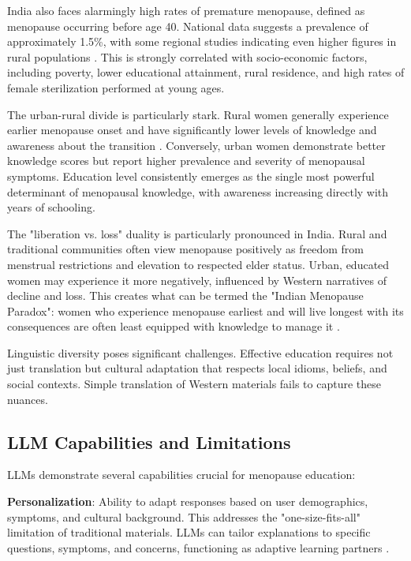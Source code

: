 \documentclass[letterpaper]{article} %
\begin{document}
India also faces alarmingly high rates of premature menopause, defined as menopause occurring before age 40. National data suggests a prevalence of approximately 1.5\%, with some regional studies indicating even higher figures in rural populations \cite{pmc2023naturalmenopause}. This is strongly correlated with socio-economic factors, including poverty, lower educational attainment, rural residence, and high rates of female sterilization performed at young ages.

The urban-rural divide is particularly stark. Rural women generally experience earlier menopause onset and have significantly lower levels of knowledge and awareness about the transition \cite{pmc2023ruralwomen}. Conversely, urban women demonstrate better knowledge scores but report higher prevalence and severity of menopausal symptoms. Education level consistently emerges as the single most powerful determinant of menopausal knowledge, with awareness increasing directly with years of schooling.

The "liberation vs. loss" duality is particularly pronounced in India. Rural and traditional communities often view menopause positively as freedom from menstrual restrictions and elevation to respected elder status. Urban, educated women may experience it more negatively, influenced by Western narratives of decline and loss. This creates what can be termed the "Indian Menopause Paradox": women who experience menopause earliest and will live longest with its consequences are often least equipped with knowledge to manage it \cite{timesofindia2023silence}.

Linguistic diversity poses significant challenges. Effective education requires not just translation but cultural adaptation that respects local idioms, beliefs, and social contexts. Simple translation of Western materials fails to capture these nuances.

\subsection{LLM Capabilities and Limitations}

LLMs demonstrate several capabilities crucial for menopause education:

\textbf{Personalization}: Ability to adapt responses based on user demographics, symptoms, and cultural background. This addresses the "one-size-fits-all" limitation of traditional materials. LLMs can tailor explanations to specific questions, symptoms, and concerns, functioning as adaptive learning partners \cite{pmc2024llm}.
\end{document}
